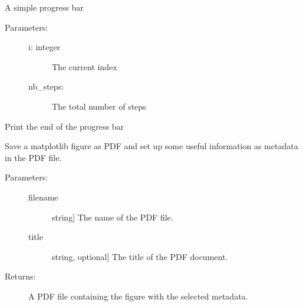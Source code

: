 \documentclass[letterpaper,10pt,english]{sphinxmanual}
\begin{document}

\begin{fulllineitems}
\label{\detokenize{appendices:s2Dcd.utili.progress_bar}}
A simple progress bar
\begin{description}
\item[{Parameters:}] \leavevmode\begin{description}
\item[{i: integer}] \leavevmode
The current index

\item[{nb\_steps:}] \leavevmode
The total number of steps

\end{description}

\end{description}

\end{fulllineitems}


\begin{fulllineitems}
\label{\detokenize{appendices:s2Dcd.utili.progress_bar_end}}
Print the end of the progress bar

\end{fulllineitems}


\begin{fulllineitems}
\label{\detokenize{appendices:s2Dcd.utili.savepdf}}
Save a matplotlib figure as PDF and set up some useful information as
metadata in the PDF file.
\begin{description}
\item[{Parameters:}] \leavevmode\begin{description}
\item[{filename}] \leavevmode{[}string{]}
The name of the PDF file.

\item[{title}] \leavevmode{[}string, optional{]}
The title of the PDF document.

\end{description}

\item[{Returns:}] \leavevmode
A PDF file containing the figure with the selected metadata.

\end{description}

\end{fulllineitems}
\end{document}
